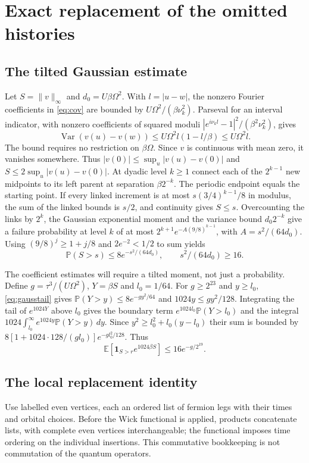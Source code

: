 \documentclass[11pt]{article}
\DeclareMathOperator{\Var}{Var}
\begin{document}
\section{Exact replacement of the omitted histories}
\subsection{The tilted Gaussian estimate}
Let $S=\|v\|_\infty$ and $d_0=U\beta\Omega^2$. With $l=|u-w|$, the nonzero Fourier coefficients in \eqref{eq:cov} are bounded by $U\Omega^2/(\beta\nu_k^2)$. Parseval for an interval indicator, with nonzero coefficients of squared moduli $|e^{i\nu_k l}-1|^2/(\beta^2\nu_k^2)$, gives
\[
 \Var(v(u)-v(w))\le U\Omega^2 l(1-l/\beta)\le U\Omega^2 l.
\]
The bound requires no restriction on $\beta\Omega$. Since $v$ is continuous with mean zero, it vanishes somewhere. Thus $|v(0)|\le\sup_u|v(u)-v(0)|$ and $S\le2\sup_u|v(u)-v(0)|$. At dyadic level $k\ge1$ connect each of the $2^{k-1}$ new midpoints to its left parent at separation $\beta 2^{-k}$. The periodic endpoint equals the starting point. If every linked increment is at most $s(3/4)^{k-1}/8$ in modulus, the sum of the linked bounds is $s/2$, and continuity gives $S\le s$. Overcounting the links by $2^k$, the Gaussian exponential moment and the variance bound $d_0 2^{-k}$ give a failure probability at level $k$ of at most $2^{k+1}e^{-A(9/8)^{k-1}}$, with $A=s^2/(64d_0)$. Using $(9/8)^j\ge 1+j/8$ and $2e^{-2}<1/2$ to sum yields
\begin{equation}\label{eq:gausstail}
 \mathbb P(S>s)\le 8e^{-s^2/(64d_0)},\qquad s^2/(64d_0)\ge16.
\end{equation}

The coefficient estimates will require a tilted moment, not just a probability. Define $g=\tau^3/(U\Omega^2)$, $Y=\beta S$ and $l_0=1/64$. For $g\ge 2^{23}$ and $y\ge l_0$, \eqref{eq:gausstail} gives $\mathbb P(Y>y)\le 8e^{-g y^2/64}$ and $1024y\le g y^2/128$. Integrating the tail of $e^{1024Y}$ above $l_0$ gives the boundary term $e^{1024l_0}\mathbb P(Y>l_0)$ and the integral $1024\int_{l_0}^\infty e^{1024y}\mathbb P(Y>y)\,dy$. Since $y^2\ge l_0^2+l_0(y-l_0)$ their sum is bounded by $8[1+1024\cdot128/(g l_0)]e^{-g l_0^2/128}$. Thus
\begin{equation}\label{eq:tilt}
 \mathbb E[\mathbf 1_{S>r} e^{1024\beta S}]\le 16e^{-g/2^{19}}.
\end{equation}

\subsection{The local replacement identity}
Use labelled even vertices, each an ordered list of fermion legs with their times and orbital choices. Before the Wick functional is applied, products concatenate lists, with complete even vertices interchangeable; the functional imposes time ordering on the individual insertions. This commutative bookkeeping is not commutation of the quantum operators.
\end{document}
